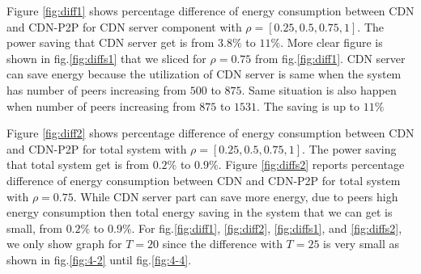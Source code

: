 \documentclass[conference]{IEEEtran}
\begin{document}
Figure \ref{fig:diff1} shows percentage difference of energy consumption between CDN and CDN-P2P for CDN server component with $\rho=[0.25,0.5,0.75,1]$.
The power saving that CDN server get is from $3.8\%$ to $11\%$.
More clear figure is shown in fig.\ref{fig:diffs1} that we sliced for $\rho=0.75$ from fig.\ref{fig:diff1}. 
CDN server can save energy because the utilization of CDN server is same when the system has number of peers increasing from $500$ to $875$.
Same situation is also happen when number of peers increasing from $875$ to $1531$.  
The saving is up to $11\%$ 

Figure \ref{fig:diff2} shows percentage difference of energy consumption between CDN and CDN-P2P for total system with $\rho=[0.25,0.5,0.75,1]$.
The power saving that total system get is from $0.2\%$ to $0.9\%$.
Figure \ref{fig:diffs2} reports percentage difference of energy consumption between CDN and CDN-P2P for total system with $\rho=0.75$.
While CDN server part can save more energy, due to peers high energy consumption then total energy saving in the system that we can get is small, from $0.2\%$ to $0.9\%$.
For fig.\ref{fig:diff1}, \ref{fig:diff2}, \ref{fig:diffs1}, and \ref{fig:diffs2}, we only show graph for $T=20$ since the difference with $T=25$ is very small as shown in fig.\ref{fig:4-2} until fig.\ref{fig:4-4}.
\end{document}

